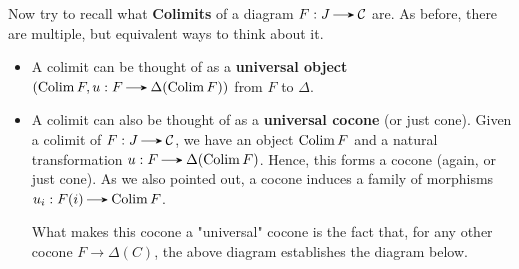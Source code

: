     Now try to recall what \textbf{Colimits} of a diagram $F: J \to
    \cc$ are. As before, there are multiple, but 
    equivalent ways to think about it. 
    \begin{itemize}
        \item A colimit can be thought of as a \textbf{universal object} 
        $(\Colim F, u: F \to \Delta(\Colim F))$ from $F$ to $\Delta$. 
        \begin{center}
            \hspace{1cm}
        \end{center}
        
        \item A colimit can also be thought of as a \textbf{universal
        cocone} (or just cone). Given a colimit of $F: J \to \cc$, we have an 
        object $\operatorname*{\mathrm{Colim }} F$ and
        a natural transformation $u: F \to \Delta(\Colim F)$. Hence, this
        forms a cocone (again, or just cone). 
        As we also pointed out, a cocone induces a family 
        of morphisms $u_i: F(i) \to \Colim F $. 

        What makes this cocone a "universal" cocone is the fact that, 
        for any other cocone $F \to \Delta(C)$, the above diagram establishes
        the diagram below. 
        \begin{center}
        \end{center}


\end{itemize}
